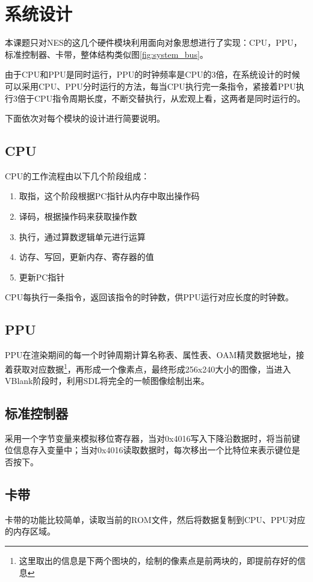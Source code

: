 \documentclass[a4paper]{ltxdoc}
\begin{document}
{\section{系统设计}
本课题只对NES的这几个硬件模块利用面向对象思想进行了实现：CPU，PPU，标准控制器、卡带，整体结构类似图\ref{fig:system_bus}。

由于CPU和PPU是同时运行，PPU的时钟频率是CPU的3倍，在系统设计的时候可以采用CPU、PPU分时运行的方法，每当CPU执行完一条指令，紧接着PPU执行3倍于CPU指令周期长度，不断交替执行，从宏观上看，这两者是同时运行的。

下面依次对每个模块的设计进行简要说明。

\subsection{CPU}
CPU的工作流程由以下几个阶段组成：
\begin{enumerate}
	\item 取指，这个阶段根据PC指针从内存中取出操作码
	\item 译码，根据操作码来获取操作数
	\item 执行，通过算数逻辑单元进行运算
	\item 访存、写回，更新内存、寄存器的值
	\item 更新PC指针
\end{enumerate}

CPU每执行一条指令，返回该指令的时钟数，供PPU运行对应长度的时钟数。

\subsection{PPU}
PPU在渲染期间的每一个时钟周期计算名称表、属性表、OAM精灵数据地址，接着获取对应数据\footnote{这里取出的信息是下两个图块的，绘制的像素点是前两块的，即提前存好的信息}，再形成一个像素点，最终形成256x240大小的图像，当进入VBlank阶段时，利用SDL将完全的一帧图像绘制出来。

\subsection{标准控制器}
采用一个字节变量来模拟移位寄存器，当对0x4016写入下降沿数据时，将当前键位信息存入变量中；当对0x4016读取数据时，每次移出一个比特位来表示键位是否按下。

\subsection{卡带}
卡带的功能比较简单，读取当前的ROM文件，然后将数据复制到CPU、PPU对应的内存区域。

}
\end{document}
